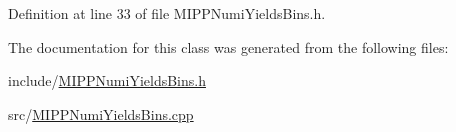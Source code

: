Definition at line 33 of file M\-I\-P\-P\-Numi\-Yields\-Bins.\-h.



The documentation for this class was generated from the following files\-:\begin{DoxyCompactItemize}
\item 
include/\hyperlink{_m_i_p_p_numi_yields_bins_8h}{M\-I\-P\-P\-Numi\-Yields\-Bins.\-h}\item 
src/\hyperlink{_m_i_p_p_numi_yields_bins_8cpp}{M\-I\-P\-P\-Numi\-Yields\-Bins.\-cpp}\end{DoxyCompactItemize}
